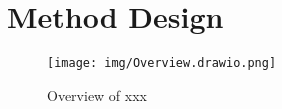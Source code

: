 \documentclass[acmsmall,screen,review,anonymous]{acmart} %
\begin{document}


\section{Method Design}
\begin{figure}[h] %
    \centering
    \texttt{[image: img/Overview.drawio.png]} %
    \caption{Overview of xxx } %
    \label{fig:overview} %
\end{figure}
\end{document}
